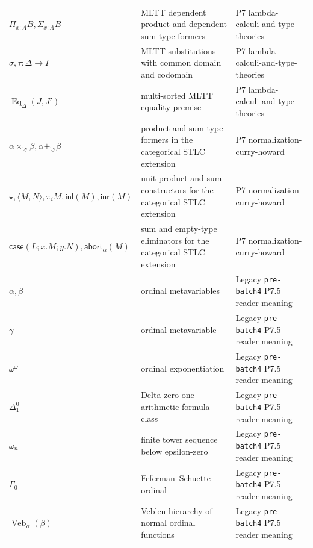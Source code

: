 \begin{longtable}{@{}p{}p{}p{}@{}}
\(\Pi_{x:A}B,\allowbreak \Sigma_{x:A}B\) & MLTT dependent product and dependent sum type formers & P7 lambda-\allowbreak{}calculi-\allowbreak{}and-\allowbreak{}type-\allowbreak{}theories \\
\(\sigma,\allowbreak \tau:\Delta\to\Gamma\) & MLTT substitutions with common domain and codomain & P7 lambda-\allowbreak{}calculi-\allowbreak{}and-\allowbreak{}type-\allowbreak{}theories \\
\(\operatorname{Eq}_{\Delta}(J,\allowbreak J')\) & multi-sorted MLTT equality premise & P7 lambda-\allowbreak{}calculi-\allowbreak{}and-\allowbreak{}type-\allowbreak{}theories \\
\(\alpha\mathbin{\times_{\mathrm{ty}}}\beta,\allowbreak \alpha\mathbin{+_{\mathrm{ty}}}\beta\) & product and sum type formers in the categorical STLC extension & P7 normalization-\allowbreak{}curry-\allowbreak{}howard \\
\(\star,\allowbreak \langle M,\allowbreak N\rangle,\allowbreak \pi_iM,\allowbreak \mathsf{inl}(M),\allowbreak \mathsf{inr}(M)\) & unit product and sum constructors for the categorical STLC extension & P7 normalization-\allowbreak{}curry-\allowbreak{}howard \\
\(\mathsf{case}(L;\allowbreak x.M;\allowbreak y.N),\allowbreak \mathsf{abort}_{\alpha}(M)\) & sum and empty-type eliminators for the categorical STLC extension & P7 normalization-\allowbreak{}curry-\allowbreak{}howard \\
\(\alpha,\allowbreak \beta\) & ordinal metavariables & Legacy \texttt{pre-\allowbreak{}batch4} P7.\allowbreak{}5 reader meaning \\
\(\gamma\) & ordinal metavariable & Legacy \texttt{pre-\allowbreak{}batch4} P7.\allowbreak{}5 reader meaning \\
\(\omega^\omega\) & ordinal exponentiation & Legacy \texttt{pre-\allowbreak{}batch4} P7.\allowbreak{}5 reader meaning \\
\(\Delta^0_1\) & Delta-zero-one arithmetic formula class & Legacy \texttt{pre-\allowbreak{}batch4} P7.\allowbreak{}5 reader meaning \\
\(\omega_n\) & finite tower sequence below epsilon-zero & Legacy \texttt{pre-\allowbreak{}batch4} P7.\allowbreak{}5 reader meaning \\
\(\Gamma_0\) & Feferman--Schuette ordinal & Legacy \texttt{pre-\allowbreak{}batch4} P7.\allowbreak{}5 reader meaning \\
\(\operatorname{Veb}_{\alpha}(\beta)\) & Veblen hierarchy of normal ordinal functions & Legacy \texttt{pre-\allowbreak{}batch4} P7.\allowbreak{}5 reader meaning \\

\end{longtable}
